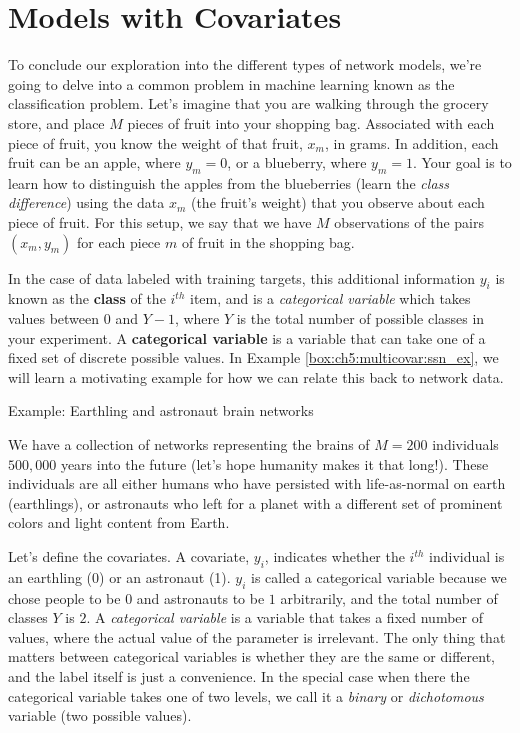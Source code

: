 \section{Models with Covariates}
\label{sec:ch5:multicovar}


To conclude our exploration into the different types of network models, we're going to delve into a common problem in machine learning known as the classification problem. Let's imagine that you are walking through the grocery store, and place $M$ pieces of fruit into your shopping bag. Associated with each piece of fruit, you know the weight of that fruit, $x_m$, in grams. In addition, each fruit can be an apple, where $y_m = 0$, or a blueberry, where $y_m = 1$. Your goal is to learn how to distinguish the apples from the blueberries (learn the \textit{class difference}) using the data $x_m$ (the fruit's weight) that you observe about each piece of fruit. For this setup, we say that we have $M$ observations of the pairs $(x_m, y_m)$ for each piece $m$ of fruit in the shopping bag. 

In the case of data labeled with training targets, this additional information $y_i$ is known as the \textbf{class} of the $i^{th}$ item, and is a \textit{categorical variable} which takes values between $0$ and $Y-1$, where $Y$ is the total number of possible classes in your experiment. A \textbf{categorical variable} is a variable that can take one of a fixed set of discrete possible values. In Example \ref{box:ch5:multicovar:ssn_ex}, we will learn a motivating example for how we can relate this back to network data.

\begin{floatingbox}[h]\caption{Example: Earthling and astronaut brain networks}
\label{box:ch5:multicovar:ssn_ex}
We have a collection of networks representing the brains of $M=200$ individuals $500,000$ years into the future (let's hope humanity makes it that long!). These individuals are all either humans who have persisted with life-as-normal on earth (earthlings), or astronauts who left for a planet with a different set of prominent colors and light content from Earth. 

Let's define the covariates. A covariate, $y_i$, indicates whether the $i^{th}$ individual is an earthling (0) or an astronaut (1). $y_i$ is called a categorical variable because we chose people to be $0$ and astronauts to be $1$ arbitrarily, and the total number of classes $Y$ is $2$. A \textit{categorical variable} is a variable that takes a fixed number of values, where the actual value of the parameter is irrelevant. The only thing that matters between categorical variables is whether they are the same or different, and the label itself is just a convenience. In the special case when there the categorical variable takes one of two levels, we call it a \textit{binary} or \textit{dichotomous} variable (two possible values). 
\end{floatingbox}

